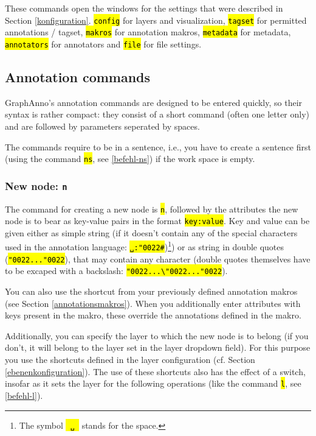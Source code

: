 \documentclass[12pt]{scrartcl}
\newcommand{\quo}{\char"0022}
\newcommand{\code}[1]{\hl{\texttt{#1}}}
\begin{document}
These commands open the windows for the settings that were described in Section \ref{konfiguration}.
\code{config} for layers and visualization, \code{tagset} for permitted annotations / tagset, \code{makros} for annotation makros, \code{metadata} for metadata, \code{annotators} for annotators and \code{file} for file settings.


\subsection{Annotation commands}\label{annotationsbefehle}

GraphAnno’s annotation commands are designed to be entered quickly, so their syntax is rather compact:
they consist of a short command (often one letter only) and are followed by parameters seperated by spaces.

The commands require to be in a sentence, i.e., you have to create a sentence first (using the command \code{ns}, see \ref{befehl-ns}) if the work space is empty.


\subsubsection{New node: \texttt{n}}\label{befehl-n}

The command for creating a new node is \code{n}, followed by the attributes the new node is to bear as key-value pairs in the format \code{key:value}.
Key and value can be given either as simple string (if it doesn’t contain any of the special characters used in the annotation language: \code{␣:\quo\#})\footnote{The symbol \code{\mbox{\,␣\,}} stands for the space.}) or as string in double quotes (\code{\quo...\quo}), that may contain any character (double quotes themselves have to be excaped with a backslash: \code{\quo...\textbackslash\quo...\quo}).

You can also use the shortcut from your previously defined annotation makros (see Section \ref{annotationsmakros}).
When you additionally enter attributes with keys present in the makro, these override the annotations defined in the makro.

Additionally, you can specify the layer to which the new node is to belong (if you don’t, it will belong to the layer set in the layer dropdown field).
For this purpose you use the shortcuts defined in the layer configuration (cf. Section \ref{ebenenkonfiguration}).
The use of these shortcuts also has the effect of a switch, insofar as it sets the layer for the following operations (like the command \code{l}, see \ref{befehl-l}).
\end{document}
